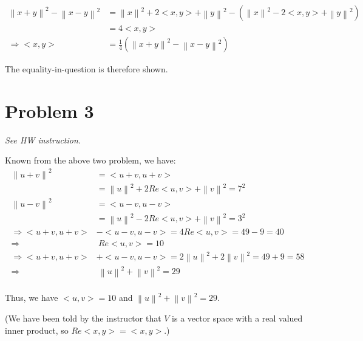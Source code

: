 \documentclass[11pt]{article}
\providecommand{\norm}[1]{\left\lVert #1 \right\rVert}
\begin{document}
\begin{align*}
    \norm{x + y}^2 - \norm{x - y}^2 &= \norm{x}^2 + 2<x, y> + \norm{y}^2  - (\norm{x}^2 - 2<x, y> + \norm{y}^2) \\
    &= 4<x, y> \\
    \Longrightarrow <x, y> &= \frac{1}{4}(\norm{x + y}^2 - \norm{x - y}^2)
\end{align*}

The equality-in-question is therefore shown.

\section*{Problem 3}
\textit{See HW instruction.}\newline

Known from the above two problem, we have:
\begin{align*}
    \norm{u + v}^2 &= <u + v, u + v> \\
    &= \norm{u}^2 + 2 Re<u, v> + \norm{v}^2 = 7^2 \\
    \norm{u - v}^2 &= <u - v, u - v> \\
    &= \norm{u}^2 - 2 Re<u, v> + \norm{v}^2 = 3^2 \\
    \Rightarrow <u + v, u + v> &- <u - v, u - v> = 4 Re <u, v> = 49 - 9 = 40 \\
    \Longrightarrow& \ Re<u, v> = 10 \\
    \Rightarrow <u + v, u + v> &+ <u - v, u - v> = 2\norm{u}^2 + 2\norm{v}^2 = 49 + 9 = 58 \\
    \Longrightarrow& \ \norm{u}^2 + \norm{v}^2 = 29 \\
\end{align*}

Thus, we have $<u, v> = 10$ and $\norm{u}^2 + \norm{v}^2 = 29$.

(We have been told by the instructor that $V$ is a vector space with a real valued inner product, so $Re<x, y> = <x, y>$.)
\end{document}
